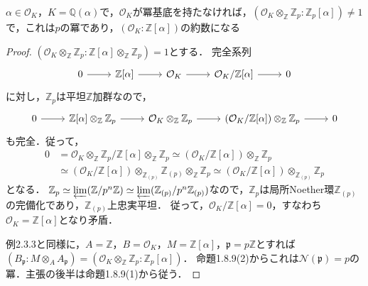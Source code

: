 \begin{screen}
  $\alpha\in\mathcal{O}_K$，$K=\mathbb{Q}(\alpha)$で，$\mathcal{O}_K$が冪基底を持たなければ，$(\mathcal{O}_K\otimes_\mathbb{Z}\mathbb{Z}_p:\mathbb{Z}_p[\alpha])\neq1$で，これは$p$の冪であり，$(\mathcal{O}_K:\mathbb{Z}[\alpha])$の約数になる
\end{screen}
\begin{proof}
  $(\mathcal{O}_K\otimes_\mathbb{Z}\mathbb{Z}_p:\mathbb{Z}[\alpha] \otimes_\mathbb{Z} \mathbb{Z}_p) = 1$とする．
  完全系列
  \[
  \begin{tikzcd}
    0 \arrow[r] & \mathbb{Z}[\alpha] \arrow[r] & \mathcal{O}_K \arrow[r] & \mathcal{O}_K/\mathbb{Z}[\alpha] \arrow[r] & 0
  \end{tikzcd}
  \]
  に対し，$\mathbb{Z}_p$は平坦$\mathbb{Z}$加群なので，
  \[
  \begin{tikzcd}
    0 \arrow[r] & \mathbb{Z}[\alpha] \otimes_\mathbb{Z} \mathbb{Z}_p \arrow[r] & \mathcal{O}_K \otimes_\mathbb{Z} \mathbb{Z}_p \arrow[r] & (\mathcal{O}_K/\mathbb{Z}[\alpha]) \otimes_\mathbb{Z} \mathbb{Z}_p \arrow[r] & 0
  \end{tikzcd}
  \]
  も完全．従って，
  \begin{align*}
    0 &= \mathcal{O}_K \otimes_\mathbb{Z} \mathbb{Z}_p / \mathbb{Z}[\alpha] \otimes_\mathbb{Z} \mathbb{Z}_p \simeq (\mathcal{O}_K/\mathbb{Z}[\alpha]) \otimes_\mathbb{Z} \mathbb{Z}_p \\
    &\simeq (\mathcal{O}_K/\mathbb{Z}[\alpha]) \otimes_{\mathbb{Z}_{(p)}} \mathbb{Z}_{(p)} \otimes_\mathbb{Z} \mathbb{Z}_p \simeq (\mathcal{O}_K/\mathbb{Z}[\alpha]) \otimes_{\mathbb{Z}_{(p)}} \mathbb{Z}_p
  \end{align*}
  となる．
  $\mathbb{Z}_p \simeq \varprojlim (\mathbb{Z}/p^n\mathbb{Z}) \simeq \varprojlim (\mathbb{Z}_{(p)}/p^n\mathbb{Z}_{(p)})$なので，$\mathbb{Z}_p$は局所Noether環$\mathbb{Z}_{(p)}$の完備化であり，$\mathbb{Z}_{(p)}$上忠実平坦．
  従って，$\mathcal{O}_K/\mathbb{Z}[\alpha] = 0$，すなわち$\mathcal{O}_K = \mathbb{Z}[\alpha]$となり矛盾．

  例2.3.3と同様に，$A=\mathbb{Z}$，$B=\mathcal{O}_K$，$M=\mathbb{Z}[\alpha]$，$\mathfrak{p}=p\mathbb{Z}$とすれば
  $(B_\mathfrak{p}:M\otimes_AA_\mathfrak{p})=(\mathcal{O}_K\otimes_\mathbb{Z}\mathbb{Z}_p:\mathbb{Z}_p[\alpha])$．
  命題1.8.9(2)からこれは$\mathcal{N}(\mathfrak{p})=p$の冪．主張の後半は命題1.8.9(1)から従う．
\end{proof}

